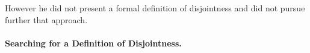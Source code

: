 However he did not present a formal definition of disjointness and did
not pursue further that approach. 

\paragraph{Searching for a Definition of Disjointness.}
 


